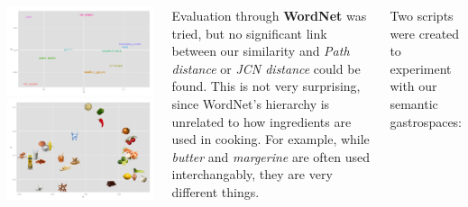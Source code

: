 \documentclass[a0paper, portrait]{tikzposter}
\begin{document}
\begin{columns}
{        \includegraphics[width=0.475\colwidth]{grapes_final.png}
        \includegraphics[width=0.475\colwidth]{ingredipic.png}

            Evaluation through \textbf{WordNet} was tried, but no significant link between our similarity and \textit{Path distance} or \textit{JCN distance} could be found. This is not very surprising, since WordNet's hierarchy is unrelated to how ingredients are used in cooking. For example, while \textit{butter} and \textit{margerine} are often used interchangably, they are very different things.
        \vspace{2cm}

        Two scripts were created to experiment with our semantic gastrospaces:
        \vspace{1cm}


}
\end{columns}
\end{document}
